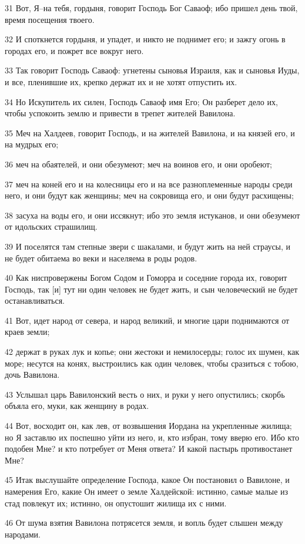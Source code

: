 \par 31 Вот, Я--на тебя, гордыня, говорит Господь Бог Саваоф; ибо пришел день твой, время посещения твоего.
\par 32 И споткнется гордыня, и упадет, и никто не поднимет его; и зажгу огонь в городах его, и пожрет все вокруг него.
\par 33 Так говорит Господь Саваоф: угнетены сыновья Израиля, как и сыновья Иуды, и все, пленившие их, крепко держат их и не хотят отпустить их.
\par 34 Но Искупитель их силен, Господь Саваоф имя Его; Он разберет дело их, чтобы успокоить землю и привести в трепет жителей Вавилона.
\par 35 Меч на Халдеев, говорит Господь, и на жителей Вавилона, и на князей его, и на мудрых его;
\par 36 меч на обаятелей, и они обезумеют; меч на воинов его, и они оробеют;
\par 37 меч на коней его и на колесницы его и на все разноплеменные народы среди него, и они будут как женщины; меч на сокровища его, и они будут расхищены;
\par 38 засуха на воды его, и они иссякнут; ибо это земля истуканов, и они обезумеют от идольских страшилищ.
\par 39 И поселятся там степные звери с шакалами, и будут жить на ней страусы, и не будет обитаема во веки и населяема в роды родов.
\par 40 Как ниспровержены Богом Содом и Гоморра и соседние города их, говорит Господь, так [и] тут ни один человек не будет жить, и сын человеческий не будет останавливаться.
\par 41 Вот, идет народ от севера, и народ великий, и многие цари поднимаются от краев земли;
\par 42 держат в руках лук и копье; они жестоки и немилосерды; голос их шумен, как море; несутся на конях, выстроились как один человек, чтобы сразиться с тобою, дочь Вавилона.
\par 43 Услышал царь Вавилонский весть о них, и руки у него опустились; скорбь объяла его, муки, как женщину в родах.
\par 44 Вот, восходит он, как лев, от возвышения Иордана на укрепленные жилища; но Я заставлю их поспешно уйти из него, и, кто избран, тому вверю его. Ибо кто подобен Мне? и кто потребует от Меня ответа? И какой пастырь противостанет Мне?
\par 45 Итак выслушайте определение Господа, какое Он постановил о Вавилоне, и намерения Его, какие Он имеет о земле Халдейской: истинно, самые малые из стад повлекут их; истинно, он опустошит жилища их с ними.
\par 46 От шума взятия Вавилона потрясется земля, и вопль будет слышен между народами.

